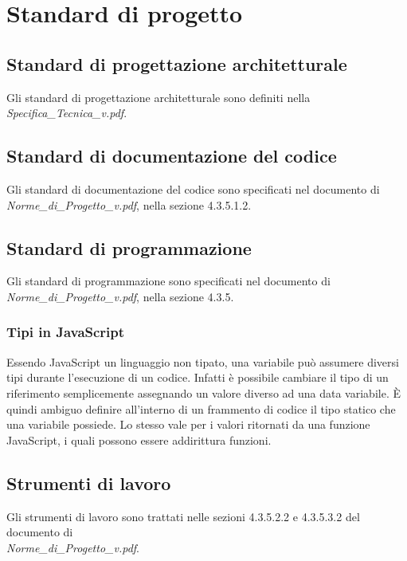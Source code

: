 \newpage
\section{Standard di progetto}
\subsection{Standard di progettazione architetturale}
Gli standard di progettazione architetturale sono definiti nella \emph{Specifica\_{}Tecnica\_{}v\versioneSpecificaTecnica{}.pdf}.

\subsection{Standard di documentazione del codice}
Gli standard di documentazione del codice sono specificati nel documento di 
\emph{Norme\_{}di\_{}Progetto\_{}v\versioneNormeDiProgetto{}.pdf}, nella sezione 4.3.5.1.2.	%

\subsection{Standard di programmazione}
Gli standard di programmazione sono specificati nel documento di 
\emph{Norme\_{}di\_{}Progetto\_{}v\versioneNormeDiProgetto{}.pdf}, nella sezione 4.3.5.	%
\subsubsection{Tipi in JavaScript}
Essendo JavaScript un linguaggio non tipato, una variabile può assumere diversi tipi durante l'esecuzione
di un codice. Infatti è possibile cambiare il tipo di un riferimento semplicemente assegnando un valore diverso ad
una data variabile. \`{E} quindi ambiguo definire all'interno di un frammento di codice il tipo statico che una variabile
possiede. Lo stesso vale per i valori ritornati da una funzione JavaScript, i quali possono essere addirittura funzioni.





\subsection{Strumenti di lavoro}
Gli strumenti di lavoro sono trattati nelle sezioni 4.3.5.2.2 e 4.3.5.3.2 del documento di \\ \emph{Norme\_{}di\_{}Progetto\_{}v\versioneNormeDiProgetto{}.pdf}.


